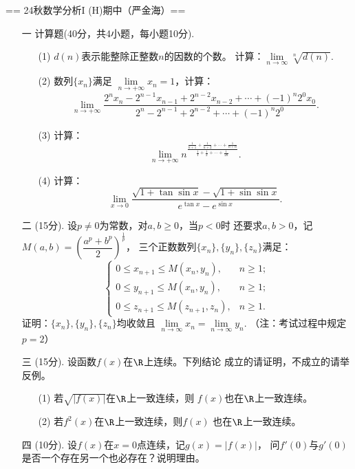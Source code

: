 == 24秋数学分析I (H)期中（严金海）==
\begin{enumerate}
    \item[一] 计算题(40分，共4小题，每小题10分).
    \begin{enumerate}
        \item[(1)]\(d(n)\)表示能整除正整数\(n\)的因数的个数。
        计算：\(\lim\limits_{n\to\infty}\sqrt[n]{d(n)}\).
        \item[(2)]数列\(\{x_n\}\)满足
        \(\lim\limits_{n\to+\infty}x_n=1\)，计算：
        \[
            \lim_{n\to+\infty}\frac{2^nx_n-2^{n-1}x_{n-1}
            +2^{n-2}x_{n-2}+\cdots+(-1)^n2^0x_0}
            {2^n-2^{n-1}+2^{n-2}+\cdots+(-1)^n2^0}.
        \]
        \item[(3)]计算：
        \[
            \lim_{n\to+\infty}n^{\frac{\frac1{n+1}+\frac1{n+2}+\cdots+\frac{1}{n+n}}
            {\frac11+\frac12+\cdots+\frac1{2n}}}.
        \]
        \item[(4)]计算：
        \[
            \lim_{x\to0}\frac{\sqrt{1+\tan\sin x}-\sqrt{1+\sin\sin x}}
            {e^{\tan x}-e^{\sin x}}.
        \]
    \end{enumerate}
    \item[二](15分). 设\(p\ne0\)为常数，对\(a,b\ge0\)，当\(p<0\)时
    还要求\(a,b>0\)，记\(M(a,b)=\left(\dfrac{a^p+b^p}2\right)^{\frac1p}\)，
    三个正数数列\(\{x_n\},\{y_n\},\{z_n\}\)满足：
    \[
        \begin{cases}
            0\le x_{n+1}\le M(x_n,y_n),&n\ge1;\\
            0\le y_{n+1}\le M(x_n,y_n),&n\ge1;\\
            0\le z_{n+1}\le M(z_{n+1},z_n),&n\ge1.
        \end{cases}
    \]
    证明：\(\{x_n\},\{y_n\},\{z_n\}\)均收敛且
    \(\lim\limits_{n\to\infty}x_n=\lim\limits_{n\to\infty}y_n\).
    （注：考试过程中规定\(p=2\)）
    \item[三](15分). 设函数\(f(x)\)在\(\R\)上连续。下列结论
    成立的请证明，不成立的请举反例。
    \begin{enumerate}
        \item[(1)]若\(\sqrt{|f(x)|}\)在\(\R\)上一致连续，则
        \(f(x)\)也在\(\R\)上一致连续。
        \item[(2)]若\(f^2(x)\)在\(\R\)上一致连续，则\(f(x)\)
        也在\(\R\)上一致连续。
    \end{enumerate}
    \item[四](10分). 设\(f(x)\)在\(x=0\)点连续，记\(g(x)=|f(x)|\)，
    问\(f'(0)\)与\(g'(0)\)是否一个存在另一个也必存在？说明理由。

\end{enumerate}
